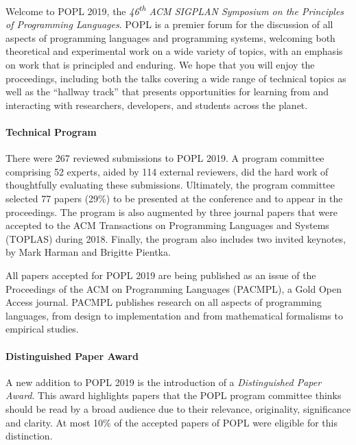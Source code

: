\label{Preface}


\newcommand\person[1]{{#1}}

\noindent

Welcome to POPL 2019, the
\emph{46\textsuperscript{th} ACM SIGPLAN Symposium
on the Principles of Programming Languages}.
%
POPL is a premier forum for the discussion of all aspects
of programming languages and programming systems, welcoming
both theoretical and experimental work on a wide variety of
topics, with an emphasis on work that is principled and enduring.
%
We hope that you will enjoy the proceedings,
including both the talks covering a wide range
of technical topics as well as the ``hallway track''
that presents opportunities for learning from
and interacting with researchers, developers,
and students across the planet.


\paragraph{Technical Program}
%
There were 267 reviewed submissions to POPL 2019.
%
A program committee comprising 52 experts,
aided by 114 external reviewers, did the hard work of
thoughtfully evaluating these submissions.
%
Ultimately, the program committee selected 77 papers (29\%)
to be presented at the conference and to appear in the
proceedings. 
%
The program is also augmented by three journal papers that were accepted to
the ACM Transactions on Programming Languages and Systems (TOPLAS) during
2018.
%
Finally, the program also includes two invited keynotes, by Mark Harman
and Brigitte Pientka.

All papers accepted for POPL 2019 are being published as an issue of the
Proceedings of the ACM on Programming Languages (PACMPL), a Gold Open Access
journal. PACMPL publishes research on all aspects of programming
languages, from design to implementation and from mathematical formalisms to
empirical studies.

\paragraph{Distinguished Paper Award}

A new addition to POPL 2019 is the introduction of a \emph{Distinguished Paper
Award}. This award highlights papers that the POPL program committee thinks
should be read by a broad audience due to their relevance, originality,
significance and clarity. At most 10\% of the accepted papers of POPL were
eligible for this distinction.

